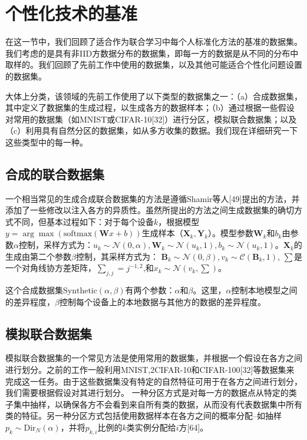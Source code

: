 \section{个性化技术的基准}
在这一节中，我们回顾了适合作为联合学习中每个人标准化方法的基准的数据集。我们考虑的是具有非IID方数据分布的数据集，即每一方的数据是从不同的分布中取样的。我们回顾了先前工作中使用的数据集，以及其他可能适合个性化问题设置的数据集。

大体上分类，该领域的先前工作使用了以下类型的数据集之一：（a）合成数据集，其中定义了数据集的生成过程，以生成各方的数据样本；（b）通过根据一些假设对常用的数据集（如MNIST或CIFAR-10[32]）进行分区，模拟联合数据集；以及（c）利用具有自然分区的数据集，如从多方收集的数据。我们现在详细研究一下这些类型中的每一种。

\subsection{合成的联合数据集}
一个相当常见的生成合成联合数据集的方法是遵循Shamir等人[49]提出的方法，并添加了一些修改以注入各方的异质性。虽然所提出的方法之间生成数据集的确切方式不同，但基本过程如下：对于每个设备$k$，根据模型$y = \arg \max(\text{softmax}(\bm{W}x+ b))$生成样本（$\bm{X}_{k}, \bm{Y}_{k}$）。模型参数$\bm{W}_{k}$和$b_{k}$由参数$\alpha$控制，采样方式为：$u_{k} \sim \mathcal{N}(0, \alpha), \bm{W}_{k} \sim \mathcal{N}(u_{k}, 1), b_{k} \sim \mathcal{N}(u_{k}, 1)$。$\bm{X}_{k}$的生成由第二个参数$\beta$控制，其采样方式为： $\bm{B}_{k} \sim \mathcal{N}(0, \beta), v_{k} \sim \mathcal{C}(\bm{B}_{k}, 1)$, $\sum$是一个对角线协方差矩阵，$\sum_{j, j} = j^{-1, 2}$,和$x_{k} \sim \mathcal{N}(v_{k}, \sum)$。

这个合成数据集$\text{Synthetic}(\alpha, \beta)$有两个参数：$\alpha$和$\beta$。这里，$\alpha$控制本地模型之间的差异程度，$\beta$控制每个设备上的本地数据与其他方的数据的差异程度。

\subsection{模拟联合数据集}
模拟联合数据集的一个常见方法是使用常用的数据集，并根据一个假设在各方之间进行划分。之前的工作一般利用MNIST,2CIFAR-10和CIFAR-100[32]等数据集来完成这一任务。由于这些数据集没有特定的自然特征可用于在各方之间进行划分，我们需要根据假设对其进行划分。 一种分区方式是对每一方的数据点从特定的类子集中抽样，以确保各方不会看到来自所有类的数据，从而没有代表数据集中所有类的特征。另一种分区方式包括使用数据样本在各方之间的概率分配--如抽样$p_{k} \sim \text{Dir}_{N}(\alpha)$，并将$p_{k, i}$比例的$k$类实例分配给$i$方[64]。

